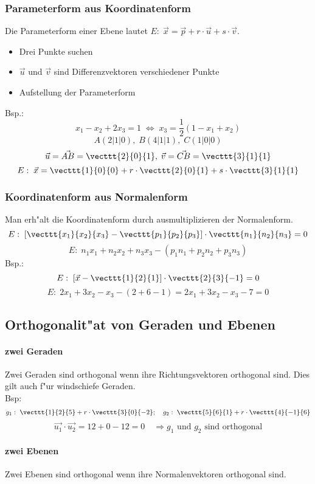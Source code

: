\documentclass[a4paper]{article}
\begin{document}
\subsubsection{Parameterform aus Koordinatenform}
Die Parameterform einer Ebene lautet $E:\; \vec{x} = \vec{p} + r \cdot \vec{u} + s \cdot \vec{v}$.
\begin{itemize}
\item Drei Punkte suchen
\item $\vec{u}$ und $\vec{v}$ sind Differenzvektoren verschiedener Punkte
\item Aufstellung der Parameterform
\end{itemize}
Bsp.:
$$ x_1 - x_2 + 2x_3 = 1 \;\Leftrightarrow \; x_3 = \frac{1}{2}(1-x_1+x_2) $$
$$ A(2|1|0), \; B(4|1|1), \; C(1|0|0) $$
$$ \vec{u} = \vec{AB} = \vecttt{2}{0}{1}, \; \vec{v} =\vec{CB}=\vecttt{3}{1}{1} $$
$$ E:\; \vec{x}=\vecttt{1}{0}{0} + r \cdot \vecttt{2}{0}{1} + s \cdot \vecttt{3}{1}{1} $$

\subsubsection{Koordinatenform aus Normalenform}
Man erh"alt die Koordinatenform durch ausmultiplizieren der Normalenform.
$$E:\; \left[ \vecttt{x_1}{x_2}{x_3} - \vecttt{p_1}{p_2}{p_3} \right] \cdot \vecttt{n_1}{n_2}{n_3} = 0$$
$$E:\; n_1x_1 + n_2x_2 + n_3x_3 - (p_1n_1+p_2n_2+p_3n_3)$$
Bsp.:
$$E:\; \left[ \vec{x} - \vecttt{1}{2}{1} \right] \cdot \vecttt{2}{3}{-1} = 0$$
$$E:\; 2 x_1 + 3 x_2 -x_3 - (2+6-1) = 2 x_1 + 3 x_2 - x_3 - 7 = 0$$

\subsection{Orthogonalit"at von Geraden und Ebenen}
\paragraph{zwei Geraden}
Zwei Geraden sind orthogonal wenn ihre Richtungsvektoren orthogonal sind. Dies gilt auch f"ur windschiefe Geraden.\\
Bsp:
$$g_1: \; \vecttt{1}{2}{5} + r \cdot \vecttt{3}{0}{-2}; \quad g_2:\; \vecttt{5}{6}{1} + r \cdot \vecttt{4}{-1}{6}$$
$$ \vec{u_1} \cdot \vec{u_2} = 12 + 0 - 12 = 0 \quad \Rightarrow g_1 \text{ und } g_2 \text{ sind orthogonal}$$

\paragraph{zwei Ebenen}
Zwei Ebenen sind orthogonal wenn ihre Normalenvektoren orthogonal sind.
\end{document}
